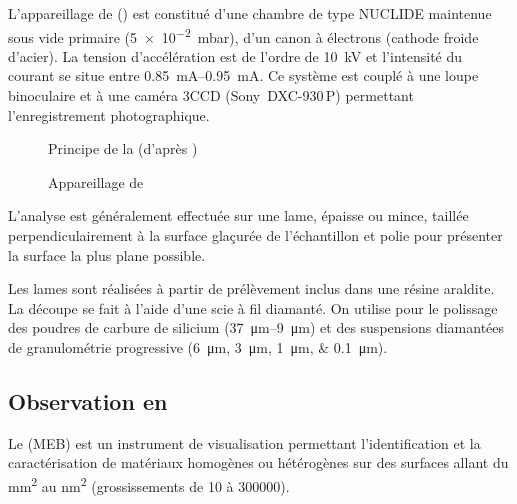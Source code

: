 L'appareillage de \CL () est constitué d'une chambre 
de type NUCLIDE maintenue sous vide primaire (\SI{5e-2}{\milli\bar}), 
d'un canon à électrons (cathode froide d'acier). La tension 
d'accélération est de l'ordre de \SI{10}{\kV} et l'intensité du 
courant se situe entre \SIrange[range-phrase=\ et\ ]{0.85}{0.95}{\mA}. 
Ce système est couplé à une loupe binoculaire et à une caméra 3CCD 
(Sony~DXC-930\,P) permettant l'enregistrement photographique.

\begin{figure}[htb]
  \caption[Principe de la \CL]
          {Principe de la \CL (d'après \cite{web_CL})}
  \label{fig:CL_principe}
\end{figure}

\begin{figure}
  \caption{Appareillage de \CL}
  \label{fig:CL_app}
\end{figure}

L'analyse est généralement effectuée sur une lame, épaisse ou mince, 
taillée perpendiculairement à la surface glaçurée de l'échantillon 
et polie pour présenter la surface la plus plane possible.

Les lames sont réalisées à partir de prélèvement inclus dans une 
résine araldite. La découpe se fait à l'aide d'une scie à fil 
diamanté. On utilise pour le polissage des poudres de carbure 
de silicium (\SIrange[range-phrase=\ et\ ]{37}{9}{\um}) et des
suspensions diamantées de granulométrie progressive 
(\SIlist{6;3;1;0.1}{\um}).

\subsection{Observation en \MEB[ie]}
Le \MEB (MEB) est un instrument de visualisation permettant 
l'identification et la caractérisation de matériaux homogènes 
ou hétérogènes sur des surfaces allant du \si{\mm\squared} au
\si{\nm\squared} (grossissements de \texttimes\num{10} à 
\texttimes\num{300000}).

